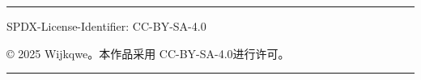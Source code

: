 \documentclass[12pt]{ctexrep}
\begin{document}


\maketitle

\tableofcontents
\hrule

SPDX-License-Identifier: CC-BY-SA-4.0

© 2025 Wijkqwe。本作品采用 CC-BY-SA-4.0进行许可。











\hrule


\end{document}
